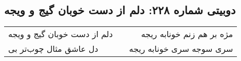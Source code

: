 \begin{center}
\section*{دوبیتی شماره ۲۲۸: دلم از دست خوبان گیج و ویجه}
\label{sec:228}
\begin{longtable}{l p{0.5cm} r}
دلم از دست خوبان گیج و ویجه
&&
مژه بر هم زنم خونابه ریجه
\\
دل عاشق مثال چوب‌تر بی
&&
سری سوجه سری خونابه ریجه
\\
\end{longtable}
\end{center}
